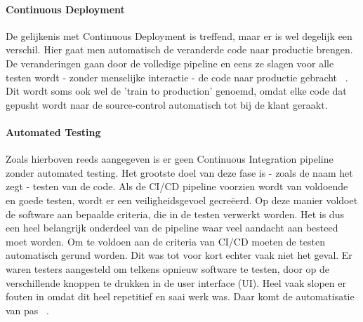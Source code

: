         \paragraph{Continuous Deployment}
        De gelijkenis met Continuous Deployment is treffend, maar er is wel degelijk een verschil.
        Hier gaat men automatisch de veranderde code naar productie brengen. De veranderingen gaan door de volledige pipeline en eens ze slagen voor alle testen wordt - zonder menselijke interactie - de code naar productie gebracht ~\autocite{Claps2015}.
        Dit wordt soms ook wel de 'train to production' genoemd, omdat elke code dat gepusht wordt naar de source-control automatisch tot bij de klant geraakt.
        
        \paragraph{Automated Testing}
        Zoals hierboven reeds aangegeven is er geen Continuous Integration pipeline zonder automated testing. Het grootste doel van deze fase is - zoals de naam het zegt - testen van de code. Als de CI/CD pipeline voorzien wordt van voldoende en goede testen, wordt er een veiligheidsgevoel gecreëerd. Op deze manier voldoet de software aan bepaalde criteria, die in de testen verwerkt worden. Het is dus een heel belangrijk onderdeel van de pipeline waar veel aandacht aan besteed moet worden. 
        Om te voldoen aan de criteria van CI/CD moeten de testen automatisch gerund worden. Dit was tot voor kort echter vaak niet het geval. Er waren testers aangesteld om telkens opnieuw software te testen, door op de verschillende knoppen te drukken in de user interface (UI). Heel vaak slopen er fouten in omdat dit heel repetitief en saai werk was. Daar komt de automatisatie van pas ~\autocite{Vocke2018}.
        
